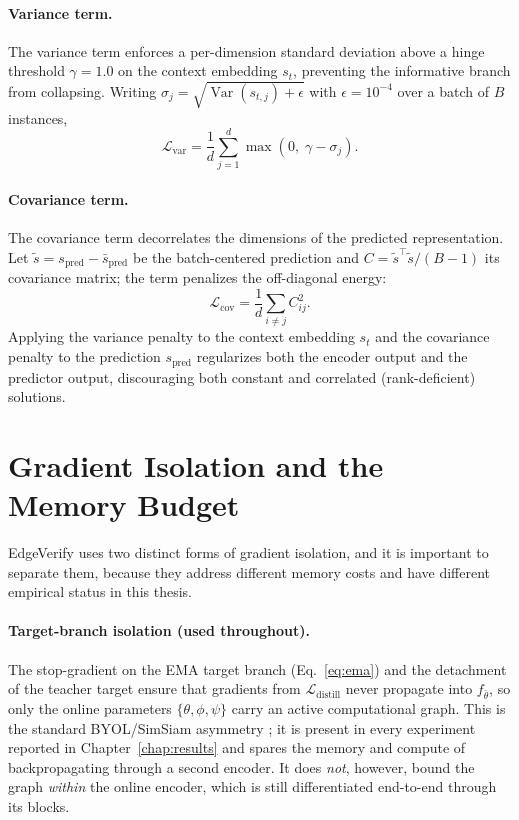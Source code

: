 \paragraph{Variance term.}
The variance term enforces a per-dimension standard deviation above a
hinge threshold $\gamma = 1.0$ on the context embedding $s_t$, preventing
the informative branch from collapsing. Writing
$\sigma_j = \sqrt{\operatorname{Var}(s_{t,j}) + \epsilon}$ with
$\epsilon = 10^{-4}$ over a batch of $B$ instances,
\begin{equation}
    \mathcal{L}_{\text{var}}
    = \frac{1}{d}\sum_{j=1}^{d} \max\!\left(0,\; \gamma - \sigma_j\right).
\end{equation}

\paragraph{Covariance term.}
The covariance term decorrelates the dimensions of the predicted
representation. Let $\tilde{s} = s_{\text{pred}} - \bar{s}_{\text{pred}}$
be the batch-centered prediction and
$C = \tilde{s}^{\top}\tilde{s} / (B - 1)$ its covariance matrix; the term
penalizes the off-diagonal energy:
\begin{equation}
    \mathcal{L}_{\text{cov}}
    = \frac{1}{d}\sum_{i \neq j} C_{ij}^{2}.
\end{equation}
Applying the variance penalty to the context embedding $s_t$ and the
covariance penalty to the prediction $s_{\text{pred}}$ regularizes both the
encoder output and the predictor output, discouraging both constant and
correlated (rank-deficient) solutions.

\section{Gradient Isolation and the Memory Budget}
EdgeVerify uses two distinct forms of gradient isolation, and it is
important to separate them, because they address different memory costs and
have different empirical status in this thesis.

\paragraph{Target-branch isolation (used throughout).}
The stop-gradient on the EMA target branch (Eq.~\ref{eq:ema}) and the
detachment of the teacher target ensure that gradients from
$\mathcal{L}_{\text{distill}}$ never propagate into $f_{\bar\theta}$, so
only the online parameters $\{\theta, \phi, \psi\}$ carry an active
computational graph. This is the standard BYOL/SimSiam asymmetry
\cite{grill2020bootstrap, chen2021exploring}; it is present in every
experiment reported in Chapter~\ref{chap:results} and spares the memory and
compute of backpropagating through a second encoder. It does \emph{not},
however, bound the graph \emph{within} the online encoder, which is still
differentiated end-to-end through its blocks.

